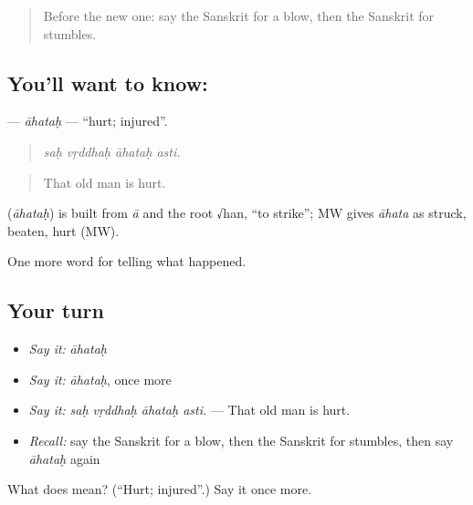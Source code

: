 \label{lesson:SA-C294-ahatah}



\begin{quote}
Before the new one: say the Sanskrit for a blow, then the Sanskrit for stumbles.
\end{quote}

\subsection*{You'll want to know: }
\textbf{} — \emph{āhataḥ} — \textquotedblleft{}hurt; injured\textquotedblright{}.

\begin{quote}
   
\end{quote}

\begin{quote}
\emph{saḥ vṛddhaḥ āhataḥ asti.}
\end{quote}

\begin{quote}
That old man is hurt.
\end{quote}

\begin{cousinweb}
\textbf{} (\emph{āhataḥ}) is built from \emph{ā} and the root √han, \textquotedblleft{}to strike\textquotedblright{}; MW gives \emph{āhata} as struck, beaten, hurt (MW).
\end{cousinweb}

\begin{grammarlens}[title={What you've built}]
One more word for telling what happened.
\end{grammarlens}

\subsection*{Your turn}
\begin{itemize}
\raggedright
  \item \emph{Say it:} \emph{āhataḥ}
  \item \emph{Say it:} \emph{āhataḥ}, once more
  \item \emph{Say it:} \emph{saḥ vṛddhaḥ āhataḥ asti.} — That old man is hurt.
  \item \emph{Recall:} say the Sanskrit for a blow, then the Sanskrit for stumbles, then say \emph{āhataḥ} again
\end{itemize}

\begin{tcolorbox}[breakable,colback=teal!4,colframe=teal!35!black,title={Before you move on}]
What does  mean? (\textquotedblleft{}Hurt; injured\textquotedblright{}.) Say it once more.
\end{tcolorbox}
